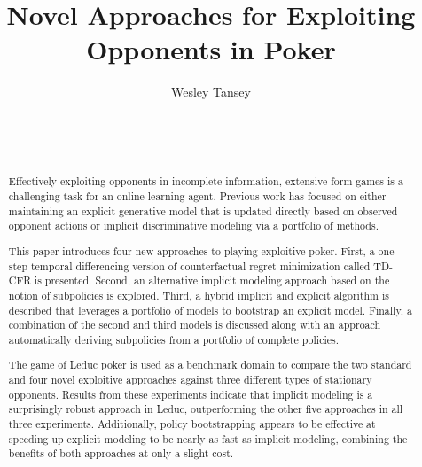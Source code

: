 \documentclass{aamas2013}
\begin{document}


\title{Novel Approaches for Exploiting Opponents in Poker}


\author{
\alignauthor
Wesley Tansey\\
       \\
       \\
       \\
}

\maketitle

\begin{abstract}
Effectively exploiting opponents in incomplete information, extensive-form games is a challenging task for an online learning agent. Previous work has focused on either maintaining an explicit generative model that is updated directly based on observed opponent actions or implicit discriminative modeling via a portfolio of methods.

This paper introduces four new approaches to playing exploitive poker. First, a one-step temporal differencing version of counterfactual regret minimization called TD-CFR is presented. Second, an alternative implicit modeling approach based on the notion of subpolicies is explored. Third, a hybrid implicit and explicit algorithm is described that leverages a portfolio of models to bootstrap an explicit model. Finally, a combination of the second and third models is discussed along with an approach automatically deriving subpolicies from a portfolio of complete policies.

The game of Leduc poker is used as a benchmark domain to compare the two standard and four novel exploitive approaches against three different types of stationary opponents. Results from these experiments indicate that implicit modeling is a surprisingly robust approach in Leduc, outperforming the other five approaches in all three experiments. Additionally, policy bootstrapping appears to be effective at speeding up explicit modeling to be nearly as fast as implicit modeling, combining the benefits of both approaches at only a slight cost.
\end{abstract}
\end{document}
